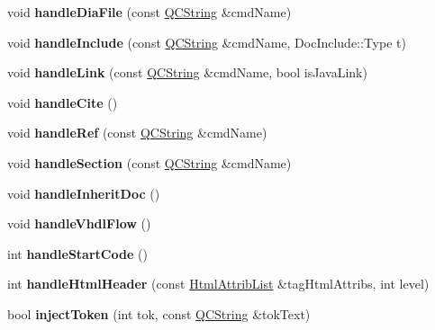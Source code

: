 \begin{DoxyCompactItemize}
\item 
\hypertarget{class_doc_para_aa1c1fcd2daeed53d9476e09504e720ab}{void {\bfseries handle\-Dia\-File} (const \hyperlink{class_q_c_string}{Q\-C\-String} \&cmd\-Name)}\label{class_doc_para_aa1c1fcd2daeed53d9476e09504e720ab}

\item 
\hypertarget{class_doc_para_a2cb86c60d771893d3905ca6836dbc133}{void {\bfseries handle\-Include} (const \hyperlink{class_q_c_string}{Q\-C\-String} \&cmd\-Name, Doc\-Include\-::\-Type t)}\label{class_doc_para_a2cb86c60d771893d3905ca6836dbc133}

\item 
\hypertarget{class_doc_para_afd401f62790198180f1550306ae1f6b4}{void {\bfseries handle\-Link} (const \hyperlink{class_q_c_string}{Q\-C\-String} \&cmd\-Name, bool is\-Java\-Link)}\label{class_doc_para_afd401f62790198180f1550306ae1f6b4}

\item 
\hypertarget{class_doc_para_a6b156cfca8b2af612f7653e893c84c34}{void {\bfseries handle\-Cite} ()}\label{class_doc_para_a6b156cfca8b2af612f7653e893c84c34}

\item 
\hypertarget{class_doc_para_aafbc7e581b3f3e2e0f19d13130ec7fc7}{void {\bfseries handle\-Ref} (const \hyperlink{class_q_c_string}{Q\-C\-String} \&cmd\-Name)}\label{class_doc_para_aafbc7e581b3f3e2e0f19d13130ec7fc7}

\item 
\hypertarget{class_doc_para_acf0c85554f36460d3d121338f7b6609f}{void {\bfseries handle\-Section} (const \hyperlink{class_q_c_string}{Q\-C\-String} \&cmd\-Name)}\label{class_doc_para_acf0c85554f36460d3d121338f7b6609f}

\item 
\hypertarget{class_doc_para_a3ab331cf94c7fd761ebbfa9c41448c95}{void {\bfseries handle\-Inherit\-Doc} ()}\label{class_doc_para_a3ab331cf94c7fd761ebbfa9c41448c95}

\item 
\hypertarget{class_doc_para_aa5d5b71860d0a47d79fd1762ac61355f}{void {\bfseries handle\-Vhdl\-Flow} ()}\label{class_doc_para_aa5d5b71860d0a47d79fd1762ac61355f}

\item 
\hypertarget{class_doc_para_a0de36ad3db47e286ec5d7213b6d4e561}{int {\bfseries handle\-Start\-Code} ()}\label{class_doc_para_a0de36ad3db47e286ec5d7213b6d4e561}

\item 
\hypertarget{class_doc_para_a1427e442f50ab9ab7e3c614d284c2340}{int {\bfseries handle\-Html\-Header} (const \hyperlink{class_html_attrib_list}{Html\-Attrib\-List} \&tag\-Html\-Attribs, int level)}\label{class_doc_para_a1427e442f50ab9ab7e3c614d284c2340}

\item 
\hypertarget{class_doc_para_a8ccf294bf9703886d07c208def70e46c}{bool {\bfseries inject\-Token} (int tok, const \hyperlink{class_q_c_string}{Q\-C\-String} \&tok\-Text)}\label{class_doc_para_a8ccf294bf9703886d07c208def70e46c}

\end{DoxyCompactItemize}
